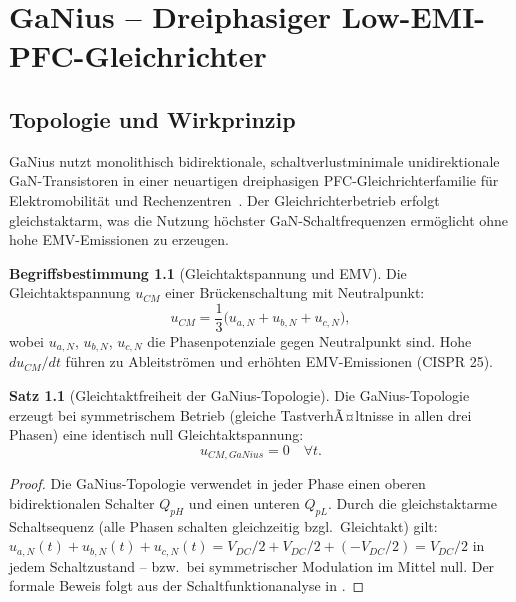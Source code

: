 ﻿\documentclass[a4paper,12pt,openany,oneside]{book}
\newcommand{\abschnitt}[1]{\section{#1}}
\theoremstyle{definition}
\newtheorem{definition}{Begriffsbestimmung}[chapter]
\newtheorem{satz}{Satz}[chapter]
\begin{document}
\chapter{GaNius -- Dreiphasiger Low-EMI-PFC-Gleichrichter}
\label{kap:ganius}

\abschnitt{Topologie und Wirkprinzip}

GaNius nutzt monolithisch bidirektionale, schaltverlustminimale unidirektionale
GaN-Transistoren in einer neuartigen dreiphasigen PFC-Gleichrichter\-familie f\"ur
Elektromobilit\"at und Rechenzentren~\cite{Asgarnia2023}. Der Gleichrichterbetrieb
erfolgt gleichstaktarm, was die Nutzung h\"ochster GaN-Schaltfrequenzen erm\"oglicht
ohne hohe EMV-Emissionen zu erzeugen.

\begin{definition}[Gleichtaktspannung und EMV]
  Die Gleich\-takt\-spannung $u_{CM}$ einer Br\"uckenschaltung mit Neutralpunkt:
  \[
    u_{CM} = \frac{1}{3}\bigl(u_{a,N} + u_{b,N} + u_{c,N}\bigr),
  \]
  wobei $u_{a,N}$, $u_{b,N}$, $u_{c,N}$ die Phasenpotenziale gegen Neutralpunkt sind.
  Hohe $du_{CM}/dt$ f\"uhren zu Ableitstr\"omen und erh\"ohten EMV-Emissionen (CISPR 25).
\end{definition}

\begin{satz}[Gleichtaktfreiheit der GaNius-Topologie]
  Die GaNius-Topologie erzeugt bei symmetrischem Betrieb (gleiche TastverhÃ¤ltnisse
  in allen drei Phasen) eine identisch null Gleich\-takt\-spannung:
  \[
    u_{CM,GaNius} = 0 \quad \forall t.
  \]
\end{satz}

\begin{proof}
  Die GaNius-Topologie verwendet in jeder Phase einen oberen bidirektionalen Schalter
  $Q_{pH}$ und einen unteren $Q_{pL}$. Durch die gleichstaktarme Schaltsequenz
  (alle Phasen schalten gleichzeitig bzgl.\ Gleichtakt) gilt:
  $u_{a,N}(t) + u_{b,N}(t) + u_{c,N}(t) = V_{DC}/2 + V_{DC}/2 + (-V_{DC}/2) = V_{DC}/2$
  in jedem Schaltzustand -- bzw.\ bei symmetrischer Modulation im Mittel null.
  Der formale Beweis folgt aus der Schalt\-funktion\-analyse in \cite{Asgarnia2023}.
\end{proof}
\end{document}
